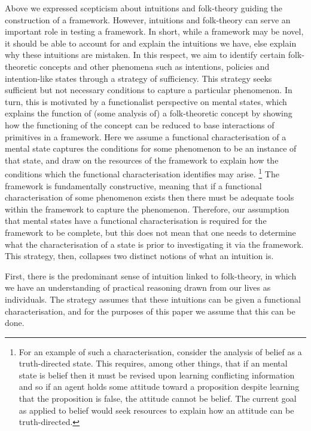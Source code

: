\documentclass[10pt]{article}
\begin{document}
Above we expressed scepticism about intuitions and folk-theory guiding the construction of a framework.
However, intuitions and folk-theory can serve an important role in testing a framework.
In short, while a framework may be novel, it should be able to account for and explain the intuitions we have, else explain why these intuitions are mistaken.
In this respect, we aim to identify certain folk-theoretic concepts and other phenomena such as intentions, policies and intention-like states through a strategy of sufficiency.
This strategy seeks sufficient but not necessary conditions to capture a particular phenomenon.
In turn, this is motivated by a functionalist perspective on mental states, which explains the function of (some analysis of) a folk-theoretic concept by showing how the functioning of the concept can be reduced to base interactions of primitives in a framework.
Here we assume a functional characterisation of a mental state captures the conditions for some phenomenon to be an instance of that state, and draw on the resources of the framework to explain how the conditions which the functional characterisation identifies may arise.\nolinebreak
\footnote{For an example of such a characterisation, consider the analysis of belief as a truth-directed state.
  This requires, among other things, that if an mental state is belief then it must be revised upon learning conflicting information and so if an agent holds some attitude toward a proposition despite learning that the proposition is false, the attitude cannot be belief.
  The current goal as applied to belief would seek resources to explain how an attitude can be truth-directed.}
The framework is fundamentally constructive, meaning that if a functional characterisation of some phenomenon exists then there must be adequate tools within the framework to capture the phenomenon.
Therefore, our assumption that mental states have a functional characterisation is required for the framework to be complete, but this does not mean that one needs to determine what the characterisation of a state is prior to investigating it via the framework.
This strategy, then, collapses two distinct notions of what an intuition is.

First, there is the predominant sense of intuition linked to folk-theory, in which we have an understanding of practical reasoning drawn from our lives as individuals.
The strategy assumes that these intuitions can be given a functional characterisation, and for the purposes of this paper we assume that this can be done.
\end{document}
